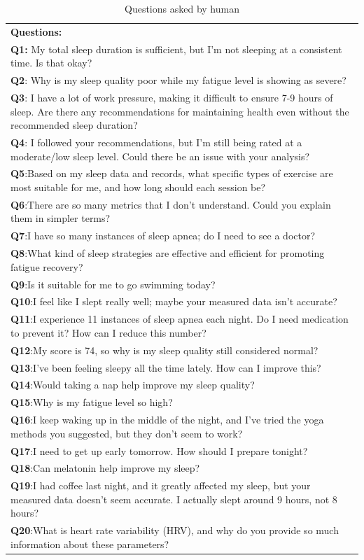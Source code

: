 \documentclass[preprint,12pt]{elsarticle}
\begin{document}
\begin{table}
\centering
\caption{\label{tab:questions}Questions asked by human}
\begin{tabular}{@{}p{}@{}}
\toprule
\textbf{Questions:} \\
\textbf{Q1:} My total sleep duration is sufficient, but I’m not sleeping at a consistent time. Is that okay?\\
\textbf{Q2}: Why is my sleep quality poor while my fatigue level is showing as severe?\\
\textbf{Q3}: I have a lot of work pressure, making it difficult to ensure 7-9 hours of sleep. Are there any recommendations for maintaining health even without the recommended sleep duration? \\
\textbf{Q4}: I followed your recommendations, but I'm still being rated at a moderate/low sleep level. Could there be an issue with your analysis?\\
\textbf{Q5}:Based on my sleep data and records, what specific types of exercise are most suitable for me, and how long should each session be?\\
\textbf{Q6}:There are so many metrics that I don't understand. Could you explain them in simpler terms?\\
\textbf{Q7}:I have so many instances of sleep apnea; do I need to see a doctor?\\
\textbf{Q8}:What kind of sleep strategies are effective and efficient for promoting fatigue recovery?\\
\textbf{Q9}:Is it suitable for me to go swimming today?\\
\textbf{Q10}:I feel like I slept really well; maybe your measured data isn’t accurate?\\
\textbf{Q11}:I experience 11 instances of sleep apnea each night. Do I need medication to prevent it? How can I reduce this number?\\
\textbf{Q12}:My score is 74, so why is my sleep quality still considered normal?\\
\textbf{Q13}:I've been feeling sleepy all the time lately. How can I improve this?\\
\textbf{Q14}:Would taking a nap help improve my sleep quality?\\
\textbf{Q15}:Why is my fatigue level so high?\\
\textbf{Q16}:I keep waking up in the middle of the night, and I've tried the yoga methods you suggested, but they don't seem to work?\\
\textbf{Q17}:I need to get up early tomorrow. How should I prepare tonight?\\
\textbf{Q18}:Can melatonin help improve my sleep?\\
\textbf{Q19}:I had coffee last night, and it greatly affected my sleep, but your measured data doesn't seem accurate. I actually slept around 9 hours, not 8 hours?\\
\textbf{Q20}:What is heart rate variability (HRV), and why do you provide so much information about these parameters?\\
\bottomrule
\end{tabular}
\end{table}
\end{document}

